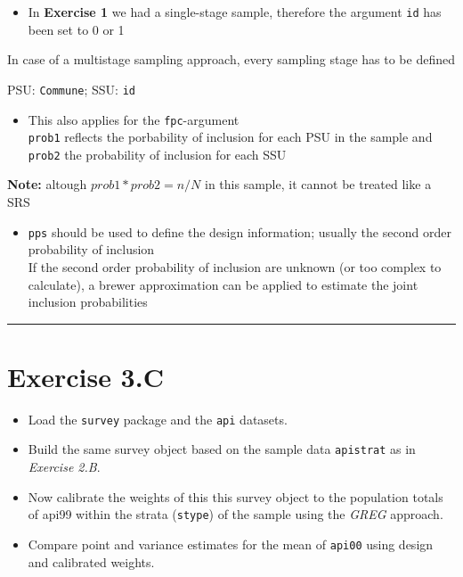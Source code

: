 \documentclass[]{article}
\providecommand{\tightlist}{%
  \setlength{\itemsep}{0pt}\setlength{\parskip}{0pt}}
\begin{document}
\begin{itemize}
\tightlist
\item
  In \textbf{Exercise 1} we had a single-stage sample, therefore the
  argument \texttt{id} has been set to 0 or 1
\end{itemize}

In case of a multistage sampling approach, every sampling stage has to
be defined

PSU: \texttt{Commune}; SSU: \texttt{id}

\begin{itemize}
\tightlist
\item
  This also applies for the \texttt{fpc}-argument\\
   \texttt{prob1} reflects the porbability of inclusion for each PSU in
  the sample and \texttt{prob2} the probability of inclusion for each
  SSU
\end{itemize}

\textbf{Note:} altough \(prob1*prob2=n/N\) in this sample, it cannot be
treated like a SRS

\begin{itemize}
\tightlist
\item
  \texttt{pps} should be used to define the design information; usually
  the second order probability of inclusion\\
   If the second order probability of inclusion are unknown (or too
  complex to calculate), a brewer approximation can be applied to
  estimate the joint inclusion probabilities
\end{itemize}

\begin{center}\rule{0.5\linewidth}{\linethickness}\end{center}

\section{Exercise 3.C}\label{exercise-3.c}

\begin{itemize}
\tightlist
\item
  Load the \texttt{survey} package and the \texttt{api} datasets.
\item
  Build the same survey object based on the sample data
  \texttt{apistrat} as in \emph{Exercise 2.B}.
\item
  Now calibrate the weights of this this survey object to the population
  totals of api99 within the strata (\texttt{stype}) of the sample using
  the \emph{GREG} approach.
\item
  Compare point and variance estimates for the mean of \texttt{api00}
  using design and calibrated weights.
\end{itemize}
\end{document}

